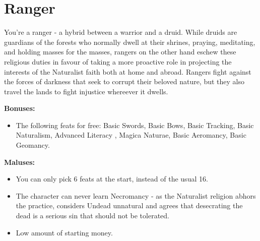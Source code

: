 \section{Ranger}
You're a ranger - a hybrid between a warrior and a druid. While druids are guardians of the forests who normally dwell at their shrines, praying, meditating, and holding masses for the masses, rangers on the other hand eschew these religious duties in favour of taking a more proactive role in projecting the interests of the Naturalist faith both at home and abroad. Rangers fight against the forces of darkness that seek to corrupt their beloved nature, but they also travel the lands to fight injustice whereever it dwells.


\textbf{Bonuses:}
\begin{itemize}
	\item The following feats for free: Basic Swords, Basic Bows, Basic Tracking, Basic Naturalism, Advanced Literacy , Magica Naturae, Basic Aeromancy, Basic Geomancy.
\end{itemize}


\textbf{Maluses:}
\begin{itemize}
	\item You can only pick 6 feats at the start, instead of the usual 16.
	\item The character can never learn Necromancy - as the Naturalist religion abhors the practice, considers Undead unnatural and agrees that desecrating the dead is a serious sin that should not be tolerated.
	\item Low amount of starting money.
\end{itemize}
